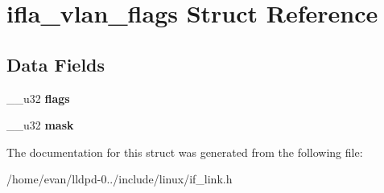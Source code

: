 \section{ifla\-\_\-vlan\-\_\-flags \-Struct \-Reference}
\label{structifla__vlan__flags}
\subsection*{\-Data \-Fields}
\begin{DoxyCompactItemize}
\item 
\-\_\-\-\_\-u32 {\bfseries flags}\label{structifla__vlan__flags_a04a0bd666e371f3fab92b8d0ef5dbdb0}

\item 
\-\_\-\-\_\-u32 {\bfseries mask}\label{structifla__vlan__flags_a12b1ee8c5efcba4a2341cc1d49f58b71}

\end{DoxyCompactItemize}


\-The documentation for this struct was generated from the following file\-:\begin{DoxyCompactItemize}
\item 
/home/evan/lldpd-\/0../include/linux/if\-\_\-link.\-h\end{DoxyCompactItemize}
